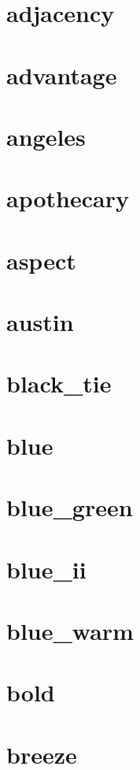 \section{adjacency}
\newpage
\section{advantage}
\newpage
\section{angeles}
\newpage
\section{apothecary}
\newpage
\section{aspect}
\newpage
\section{austin}
\newpage
\section{black\_tie}
\newpage
\section{blue}
\newpage
\section{blue\_green}
\newpage
\section{blue\_ii}
\newpage
\section{blue\_warm}
\newpage
\section{bold}
\newpage
\section{breeze}
\newpage
